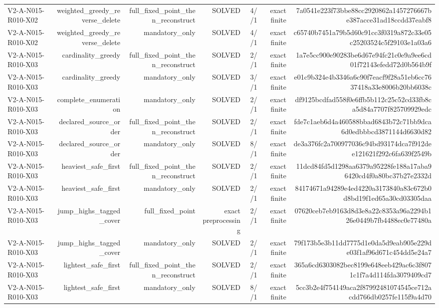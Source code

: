 {\begin{longtable}{lrrrrrr}
V2-A-N015-R010-X02 & weighted\_greedy\_reverse\_delete & full\_fixed\_point\_then\_reconstruct & SOLVED & 4//1 & exact finite & 7a0541e223f73bbe88cc2920862a1457276667be387acce31ad18ccdd37eabf8 \\
V2-A-N015-R010-X02 & weighted\_greedy\_reverse\_delete & mandatory\_only & SOLVED & 4//1 & exact finite & c65740b7451a79b5d60c91cc3f0319a872c33e05c25203524c5f29103e1a03a6 \\
V2-A-N015-R010-X03 & cardinality\_greedy & full\_fixed\_point\_then\_reconstruct & SOLVED & 2//1 & exact finite & 1a7e5cc900e90283be6d67e94fc21c0e9a9ee6cd01f72143efedd72d0b564b9f \\
V2-A-N015-R010-X03 & cardinality\_greedy & mandatory\_only & SOLVED & 3//1 & exact finite & e01c9b324e4b3346a6c90f7eacf9f28a51eb6cc7637418a33e8006b20bb6038c \\
V2-A-N015-R010-X03 & complete\_enumeration & mandatory\_only & SOLVED & 2//1 & exact finite & df9125bcdfad558f0e6ffb5b112c25c52cd33fb8ca5d84a7707f825709929edc \\
V2-A-N015-R010-X03 & declared\_source\_order & full\_fixed\_point\_then\_reconstruct & SOLVED & 2//1 & exact finite & fde7c1aeb6d4a460588bbad6843b72c71bb9dca6d0edbbbcd3871144d6630d82 \\
V2-A-N015-R010-X03 & declared\_source\_order & mandatory\_only & SOLVED & 8//1 & exact finite & de3a376fc2a700977036c94bd93174dca7f912dee121621f292c6fa639f2549b \\
V2-A-N015-R010-X03 & heaviest\_safe\_first & full\_fixed\_point\_then\_reconstruct & SOLVED & 2//1 & exact finite & 11dcd84fd5d1298aa6379a95228fe188a17aba96420cd4f0a80bc37b27e2332d \\
V2-A-N015-R010-X03 & heaviest\_safe\_first & mandatory\_only & SOLVED & 2//1 & exact finite & 84174671a94289e4ed4220a3173840a83c672b0d8bd19f1ed65a30cd03305daa \\
V2-A-N015-R010-X03 & jump\_highs\_tagged\_cover & full\_fixed\_point & exact preprocessing & 2//1 & exact finite & 07620ceb7eb9163d8d3e8a22c8353a96a2294b126e0449b7fb4488ec0e77480a \\
V2-A-N015-R010-X03 & jump\_highs\_tagged\_cover & mandatory\_only & SOLVED & 2//1 & exact finite & 79f173b5e3b11dd7775d1e0da5d9eab905e229de03f1af96d671c454dd5e24a7 \\
V2-A-N015-R010-X03 & lightest\_safe\_first & full\_fixed\_point\_then\_reconstruct & SOLVED & 2//1 & exact finite & 365a6cd6303082bec8199e648eeb429ac6c3f8071c1f7a4d114fda3079409cd7 \\
V2-A-N015-R010-X03 & lightest\_safe\_first & mandatory\_only & SOLVED & 8//1 & exact finite & 5cc3b2e4f754149aca2f87992481074545ce712acdd766db0257fe115f9a4d70 \\

\end{longtable}}
